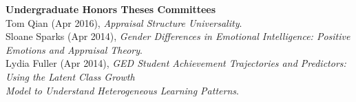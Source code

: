 {\large \textbf{Undergraduate Honors Theses Committees}}\\
Tom Qian (Apr 2016), \textit{Appraisal Structure Universality}.%
\smallskip\\
Sloane Sparks (Apr 2014), \textit{Gender Differences in Emotional Intelligence: Positive Emotions and Appraisal Theory}.%
\smallskip\\%
Lydia Fuller (Apr 2014), \textit{GED Student Achievement Trajectories and Predictors: Using the Latent Class Growth\\
\hspace* {6 mm}Model to Understand Heterogeneous Learning Patterns}.%

